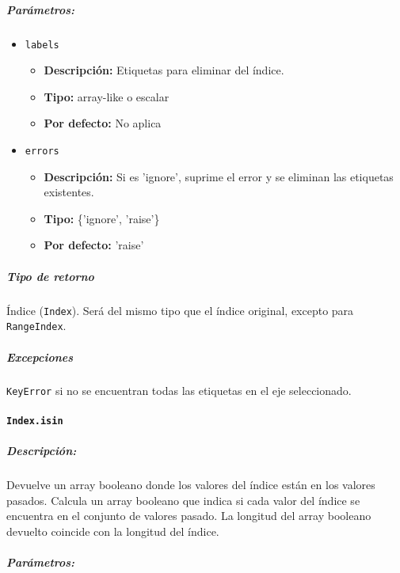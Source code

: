 \subparagraph{Parámetros:}

\begin{itemize}
    \item \texttt{labels}
          \begin{itemize}
              \item \textbf{Descripción:} Etiquetas para eliminar del índice.
              \item \textbf{Tipo:} array-like o escalar
              \item \textbf{Por defecto:} No aplica
          \end{itemize}
    \item \texttt{errors}
          \begin{itemize}
              \item \textbf{Descripción:} Si es 'ignore', suprime el error y se
                    eliminan las etiquetas existentes.
              \item \textbf{Tipo:} \{'ignore', 'raise'\}
              \item \textbf{Por defecto:} 'raise'
          \end{itemize}
\end{itemize}

\subparagraph{Tipo de retorno}
Índice (\texttt{Index}). Será del mismo tipo que el índice original, excepto
para \texttt{RangeIndex}.

\subparagraph{Excepciones}
\texttt{KeyError} si no se encuentran todas las etiquetas en el eje
seleccionado.

\paragraph{\texttt{Index.isin}}

\subparagraph{Descripción:}
Devuelve un array booleano donde los valores del índice están en los valores
pasados. Calcula un array booleano que indica si cada valor del índice se
encuentra en el conjunto de valores pasado. La longitud del array booleano
devuelto coincide con la longitud del índice.

\subparagraph{Parámetros:}

